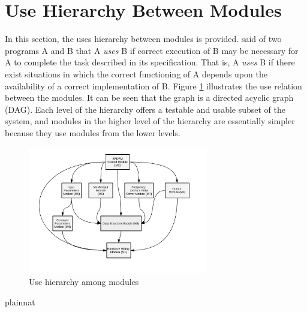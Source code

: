 \documentclass[12pt, titlepage]{article}
\begin{document}
	\section{Use Hierarchy Between Modules} \label{SecUse}
	
	In this section, the uses hierarchy between modules is provided.
	\citet{Parnas1978} said of two programs A and B that A {\em uses} B if correct
	execution of B may be necessary for A to complete the task described in its
	specification. That is, A {\em uses} B if there exist situations in which the
	correct functioning of A depends upon the availability of a correct
	implementation of B.  Figure \ref{FigUH} illustrates the use relation between
	the modules. It can be seen that the graph is a directed acyclic graph (DAG).
	Each level of the hierarchy offers a testable and usable subset of the system,
	and modules in the higher level of the hierarchy are essentially simpler because
	they use modules from the lower levels.
	
	\begin{figure}[H] \centering \includegraphics[width=0.7\textwidth]{MG-Chart.pdf}
		\caption{Use hierarchy among modules} \label{FigUH} \end{figure}
	
	
	 {plainnat} 
	
\end{document}
